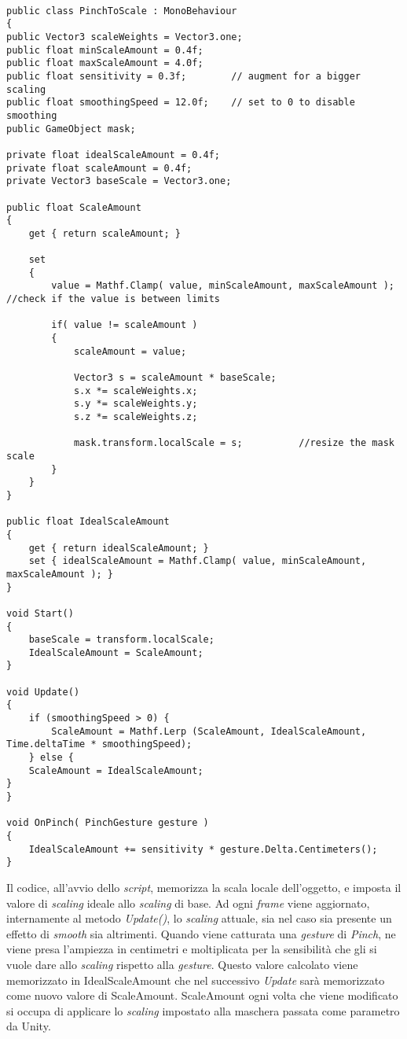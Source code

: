 \begin{lstlisting}

public class PinchToScale : MonoBehaviour
{
public Vector3 scaleWeights = Vector3.one;
public float minScaleAmount = 0.4f;
public float maxScaleAmount = 4.0f;
public float sensitivity = 0.3f;		// augment for a bigger scaling
public float smoothingSpeed = 12.0f;    // set to 0 to disable smoothing
public GameObject mask;

private float idealScaleAmount = 0.4f;
private float scaleAmount = 0.4f;
private Vector3 baseScale = Vector3.one;

public float ScaleAmount
{
	get { return scaleAmount; }
	
	set 
	{ 
		value = Mathf.Clamp( value, minScaleAmount, maxScaleAmount );	//check if the value is between limits
		
		if( value != scaleAmount )
		{
			scaleAmount = value;
			
			Vector3 s = scaleAmount * baseScale;
			s.x *= scaleWeights.x;
			s.y *= scaleWeights.y;
			s.z *= scaleWeights.z;
			
			mask.transform.localScale = s;			//resize the mask scale
		}
	}
}

public float IdealScaleAmount
{
	get { return idealScaleAmount; }
	set { idealScaleAmount = Mathf.Clamp( value, minScaleAmount, maxScaleAmount ); }
}

void Start()
{
	baseScale = transform.localScale;
	IdealScaleAmount = ScaleAmount;
}

void Update()
{
	if (smoothingSpeed > 0) {
		ScaleAmount = Mathf.Lerp (ScaleAmount, IdealScaleAmount, Time.deltaTime * smoothingSpeed);
	} else {
	ScaleAmount = IdealScaleAmount;
}
}

void OnPinch( PinchGesture gesture )
{  
	IdealScaleAmount += sensitivity * gesture.Delta.Centimeters();
} 
\end{lstlisting}
\noindent
Il codice, all'avvio dello \textit{script}, memorizza la scala locale dell'oggetto, e imposta il valore di \textit{scaling} ideale allo \textit{scaling} di base. Ad ogni \textit{frame} viene aggiornato, internamente al metodo \textit{Update()}, lo \textit{scaling} attuale, sia nel caso sia presente un effetto di \textit{smooth} sia altrimenti. Quando viene catturata una \textit{gesture} di \textit{Pinch}, ne viene presa l'ampiezza in centimetri e moltiplicata per la sensibilit\`a che gli si vuole dare allo \textit{scaling} rispetto alla \textit{gesture}. Questo valore calcolato viene memorizzato in IdealScaleAmount che nel successivo \textit{Update} sar\`a memorizzato come nuovo valore di ScaleAmount. ScaleAmount ogni volta che viene modificato si occupa di applicare lo \textit{scaling} impostato alla maschera passata come parametro da Unity.\\\\


